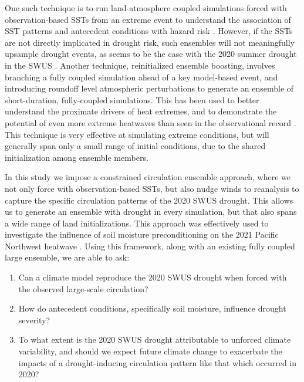 \documentclass[draft]{agujournal2019}
\begin{document}
One such technique is to run land-atmosphere coupled simulations forced with observation-based SSTs from an extreme event to understand the association of SST patterns and antecedent conditions with hazard risk \cite{hoell2022,seager2022}.
However, if the SSTs are not directly implicated in drought risk, such ensembles will not meaningfully upsample drought events, as seems to be the case with the 2020 summer drought in the SWUS \cite{jiang2025}.
Another technique, reinitialized ensemble boosting, involves branching a fully coupled simulation ahead of a key model-based event, and introducing roundoff level atmospheric perturbations to generate an ensemble of short-duration, fully-coupled simulations. 
This has been used to better understand the proximate drivers of heat extremes, and to demonstrate the potential of even more extreme heatwaves than seen in the observational record \cite{gessner2021, fischer2023}. 
This technique is very effective at simulating extreme conditions, but will generally span only a small range of initial conditions, due to the shared initialization among ensemble members.

In this study we impose a constrained circulation ensemble approach, where we not only force with observation-based SSTs, but also nudge winds to reanalysis to capture the specific circulation patterns of the 2020 SWUS drought. 
This allows us to generate an ensemble with drought in every simulation, but that also spans a wide range of land initializations. 
This approach was effectively used to investigate the influence of soil moisture preconditioning on the 2021 Pacific Northwest heatwave \cite{duan2025}.
Using this framework, along with an existing fully coupled large ensemble, we are able to ask:
\begin{enumerate}
\item Can a climate model reproduce the 2020 SWUS drought when forced with the observed large-scale circulation?
\item How do antecedent conditions, specifically soil moisture, influence drought severity?
\item To what extent is the 2020 SWUS drought attributable to unforced climate variability, and should we expect future climate change to exacerbate the impacts of a drought-inducing circulation pattern like that which occurred in 2020?
\end{enumerate}






%
%
\end{document}
